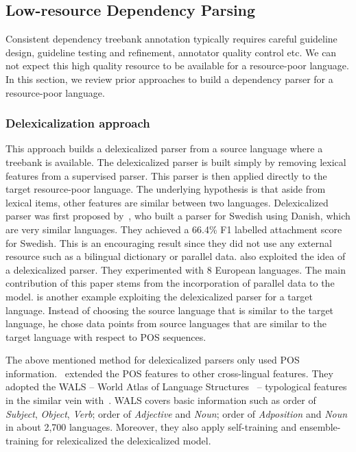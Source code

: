 \documentclass[12pt,twoside,final,hidelinks]{ltthesis}
\theoremstyle{definition}
\begin{document}
\subsection{Low-resource Dependency Parsing}
\label{sec:crosslingualDepParsing}
Consistent dependency treebank annotation typically requires careful guideline design, guideline testing and refinement, annotator quality control etc. %
We can not expect this high quality resource to be available for a resource-poor language. In this section, we review prior approaches to build a dependency parser for a resource-poor language.
 
\subsubsection{Delexicalization approach}
\label{sec:delexapproach}
This approach builds a delexicalized parser from a source language where a treebank is available. The delexicalized parser is built simply by removing lexical features from a supervised parser. This parser is then applied directly to the target resource-poor language. The underlying hypothesis is that aside from lexical items, other features are similar between two languages. 
Delexicalized parser was first proposed by~, who built a parser for Swedish using Danish, which are very similar languages.  They achieved a 66.4\% F1 labelled attachment score for Swedish. This is an encouraging result since they did not use any external resource such as a bilingual dictionary or parallel data. 
 also exploited the idea of a delexicalized parser. They experimented with 8 European languages. The main contribution of this paper stems from the incorporation of parallel data to the model. %
 is another example exploiting the delexicalized parser for a target language. Instead of choosing the source language that is similar to the target language, he chose data points from source languages that are similar to the target language with respect to POS sequences.

The above mentioned method for delexicalized parsers only used POS information.~ extended the POS features to other cross-lingual features. They adopted the WALS -- World Atlas of Language Structures~\cite{wals} --  typological features in the similar vein with~\cite{Naseem:2012:SSM}. WALS covers basic information such as order of \textit{Subject}, \textit{Object}, \textit{Verb}; order of \textit{Adjective} and \textit{Noun}; order of \textit{Adposition} and \textit{Noun} in  about 2,700 languages. Moreover, they also apply self-training and ensemble-training for relexicalized the delexicalized model. 
\end{document}
